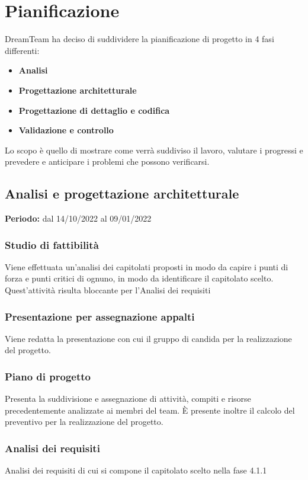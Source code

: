 \section{Pianificazione}
DreamTeam ha deciso di suddividere la pianificazione di progetto in 4 fasi differenti:

\begin{itemize}
\item \textbf{Analisi}
\item \textbf{Progettazione architetturale}
\item \textbf{Progettazione di dettaglio e codifica}
\item	 \textbf{Validazione e controllo}
\end{itemize}

Lo scopo è quello di mostrare come verrà suddiviso il lavoro, valutare i progressi e prevedere e anticipare i problemi che possono verificarsi.

\subsection{Analisi e progettazione architetturale}
\textbf{Periodo:} dal 14/10/2022 al 09/01/2022
\subsubsection{Studio di fattibilità}
Viene effettuata un’analisi dei capitolati proposti in modo da capire i punti di forza e punti critici di ognuno, in modo da identificare il capitolato scelto.  Quest’attività risulta bloccante per l’Analisi dei requisiti
\subsubsection{Presentazione per assegnazione appalti}
Viene redatta la presentazione con cui il gruppo di candida per la realizzazione del progetto.
\subsubsection{Piano di progetto}
Presenta la suddivisione e assegnazione di attività, compiti e risorse precedentemente analizzate ai membri del team. È presente inoltre il calcolo del preventivo per la realizzazione del progetto.
\subsubsection{Analisi dei requisiti}
Analisi dei requisiti di cui si compone il capitolato scelto nella fase 4.1.1
